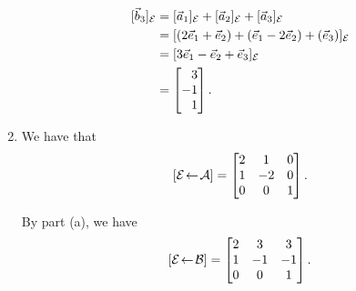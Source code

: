 \begin{exercises}
\begin{problist}
\begin{solution}
\begin{enumerate}
\[\begin{aligned}
						[\vec b_3]_{\mathcal E}&=[\vec a_1]_{\mathcal E}+[\vec a_2]_{\mathcal E}+[\vec a_3]_{\mathcal E}\\
						&=[(2\vec e_1+\vec e_2)+(\vec e_1-2\vec e_2)+(\vec e_3)]_{\mathcal E}\\
						&=[3\vec e_1-\vec e_2+\vec e_3]_{\mathcal E}\\&=\mat{3\\-1\\1}.
					\end{aligned}
				\]
				\item We have that
				\[
					\BasisChange{\mathcal A}{\mathcal E}=
					\begin{bmatrix}
						2 & 1 & 0\\
						1 & -2 & 0\\
						0 & 0 & 1
					\end{bmatrix}.
				\]
				
				By part (a), we have
				\[
					\BasisChange{\mathcal B}{\mathcal E}=
					\begin{bmatrix}
						2 & 3 & 3\\
						1 & -1 & -1\\
						0 & 0 & 1
					\end{bmatrix}.
				\]
				

\end{enumerate}
\end{solution}
\end{problist}
\end{exercises}
